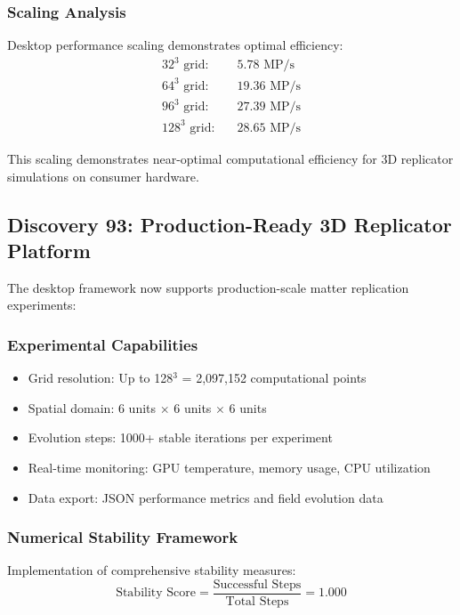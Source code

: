 \documentclass[11pt]{article}
\begin{document}
\subsubsection{Scaling Analysis}
Desktop performance scaling demonstrates optimal efficiency:
\begin{align}
\text{32}^3 \text{ grid:} \quad &5.78 \text{ MP/s} \\
\text{64}^3 \text{ grid:} \quad &19.36 \text{ MP/s} \\
\text{96}^3 \text{ grid:} \quad &27.39 \text{ MP/s} \\
\text{128}^3 \text{ grid:} \quad &28.65 \text{ MP/s}
\end{align}

This scaling demonstrates near-optimal computational efficiency for 3D replicator simulations on consumer hardware.

\subsection{Discovery 93: Production-Ready 3D Replicator Platform}

The desktop framework now supports production-scale matter replication experiments:

\subsubsection{Experimental Capabilities}
\begin{itemize}
\item Grid resolution: Up to 128$^3$ = 2,097,152 computational points
\item Spatial domain: 6 units $\times$ 6 units $\times$ 6 units
\item Evolution steps: 1000+ stable iterations per experiment
\item Real-time monitoring: GPU temperature, memory usage, CPU utilization
\item Data export: JSON performance metrics and field evolution data
\end{itemize}

\subsubsection{Numerical Stability Framework}
Implementation of comprehensive stability measures:
\begin{equation}
\text{Stability Score} = \frac{\text{Successful Steps}}{\text{Total Steps}} = 1.000
\end{equation}
\end{document}
